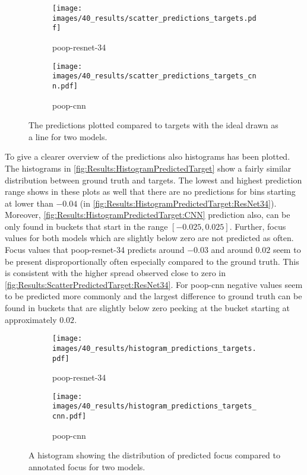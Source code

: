 \begin{figure}
    \centering
    \begin{subfigure}[b]{0.5\textwidth}
        \texttt{[image: images/40\_results/scatter\_predictions\_targets.pdf]}
        \caption{\acs{poop}-\acs{resnet}-34}
        \label{fig:Results:ScatterPredictedTarget:ResNet34}
    \end{subfigure}%
    \begin{subfigure}[b]{0.5\textwidth}
        \texttt{[image: images/40\_results/scatter\_predictions\_targets\_cnn.pdf]}
        \caption{\acs{poop}-\acs{cnn}}
        \label{fig:Results:ScatterPredictedTarget:CNN}
    \end{subfigure}
    \caption{The predictions plotted compared to targets with the ideal drawn as a line for two models.}
    \label{fig:Results:ScatterPredictedTarget}
\end{figure}

To give a clearer overview of the predictions also histograms has been plotted. The histograms in \autoref{fig:Results:HistogramPredictedTarget} show a fairly similar distribution between ground truth and targets. The lowest and highest prediction range shows in these plots as well that there are no predictions for bins starting at lower than $-0.04$ (in \autoref{fig:Results:HistogramPredictedTarget:ResNet34}). Moreover, \autoref{fig:Results:HistogramPredictedTarget:CNN} prediction also, can be only found in buckets that start in the range $[-0.025, 0.025]$. Further, focus values for both models which are slightly below zero are not predicted as often. Focus values that \acs{poop}-\acs{resnet}-34 predicts around $-0.03$ and around $0.02$ seem to be present disproportionally often especially compared to the ground truth. This is consistent with the higher spread observed close to zero in \autoref{fig:Results:ScatterPredictedTarget:ResNet34}. For \acs{poop}-\acs{cnn} negative values seem to be predicted more commonly and the largest difference to ground truth can be found in buckets that are slightly below zero peeking at the bucket starting at approximately $0.02$.

\begin{figure}
    \centering
    \begin{subfigure}[b]{0.5\textwidth}
        \texttt{[image: images/40\_results/histogram\_predictions\_targets.pdf]}
        \caption{\acs{poop}-\acs{resnet}-34}
        \label{fig:Results:HistogramPredictedTarget:ResNet34}
    \end{subfigure}%
    \begin{subfigure}[b]{0.5\textwidth}
        \texttt{[image: images/40\_results/histogram\_predictions\_targets\_cnn.pdf]}
        \caption{\acs{poop}-\acs{cnn}}
        \label{fig:Results:HistogramPredictedTarget:CNN}
    \end{subfigure}
    \caption{A histogram showing the distribution of predicted focus compared to annotated focus for two models.}
    \label{fig:Results:HistogramPredictedTarget}

\end{figure}


